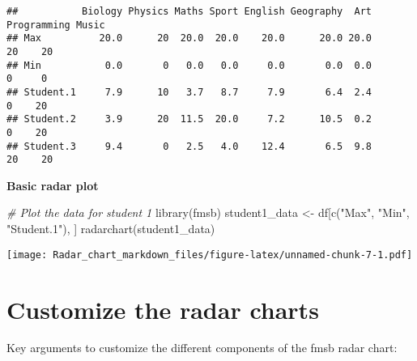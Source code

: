 \documentclass[
]{article}
\newenvironment{Shaded}{\begin{snugshade}}{\end{snugshade}}
\newcommand{\CommentTok}[1]{\textcolor[rgb]{0.56,0.35,0.01}{\textit{#1}}}
\newcommand{\FunctionTok}[1]{\textcolor[rgb]{0.00,0.00,0.00}{#1}}
\newcommand{\NormalTok}[1]{#1}
\newcommand{\OtherTok}[1]{\textcolor[rgb]{0.56,0.35,0.01}{#1}}
\newcommand{\StringTok}[1]{\textcolor[rgb]{0.31,0.60,0.02}{#1}}
\begin{document}
\begin{verbatim}
##           Biology Physics Maths Sport English Geography  Art Programming Music
## Max          20.0      20  20.0  20.0    20.0      20.0 20.0          20    20
## Min           0.0       0   0.0   0.0     0.0       0.0  0.0           0     0
## Student.1     7.9      10   3.7   8.7     7.9       6.4  2.4           0    20
## Student.2     3.9      20  11.5  20.0     7.2      10.5  0.2           0    20
## Student.3     9.4       0   2.5   4.0    12.4       6.5  9.8          20    20
\end{verbatim}

\textbf{Basic radar plot}

\begin{Shaded}
\begin{Highlighting}[]
\CommentTok{\# Plot the data for student 1}
\FunctionTok{library}\NormalTok{(fmsb)}
\NormalTok{student1\_data }\OtherTok{\textless{}{-}}\NormalTok{ df[}\FunctionTok{c}\NormalTok{(}\StringTok{"Max"}\NormalTok{, }\StringTok{"Min"}\NormalTok{, }\StringTok{"Student.1"}\NormalTok{), ]}
\FunctionTok{radarchart}\NormalTok{(student1\_data)}
\end{Highlighting}
\end{Shaded}

\texttt{[image: Radar\_chart\_markdown\_files/figure-latex/unnamed-chunk-7-1.pdf]}

\hypertarget{customize-the-radar-charts}{%
\section{Customize the radar charts}\label{customize-the-radar-charts}}

Key arguments to customize the different components of the fmsb radar
chart:
\end{document}
